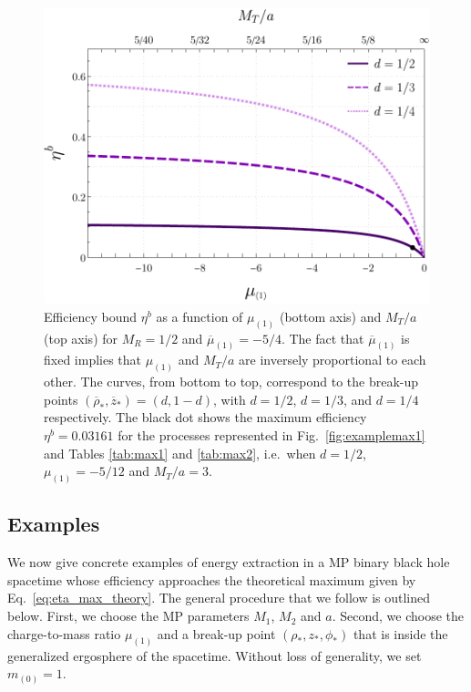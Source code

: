 \begin{figure}[!ht]
  \centering
  \includegraphics[width=\linewidth]{img/penrose_binaries/fig10.pdf}
  \caption{Efficiency bound $\eta ^ b$ as a function of $\mu_{(1)}$ (bottom axis) and $M_T/a$ (top axis) for $M_R=1/2$ and $\overline \mu _{(1)} = -5/4$. The fact that $\overline \mu _{(1)}$ is fixed implies that $\mu_{(1)}$ and $M_T/a$ are inversely proportional to each other. The curves, from bottom to top, correspond to the break-up points $(\overline \rho_*, \overline z_*)=(d,1-d)$, with $d=1/2$, $d=1/3$, and $d=1/4$ respectively. The black dot shows the maximum efficiency $\eta^b = 0.03161$ for the processes represented in Fig.~\ref{fig:examplemax1} and Tables \ref{tab:max1} and \ref{tab:max2}, i.e.~when $d=1/2$, $\mu_{(1)} = - 5/12$ and $M_T/a=3$.}
  \label{fig:efficiency1}
\end{figure}

\subsection{Examples}

We now give concrete examples of energy extraction in a \ac{MP} binary black hole spacetime whose efficiency approaches the theoretical maximum given by Eq.~\eqref{eq:eta_max_theory}. The general procedure that we follow is outlined below. First, we choose the \ac{MP} parameters $M_1$, $M_2$ and $a$. Second, we choose the charge-to-mass ratio $\mu_{(1)}$ and a break-up point $(\rho_*,z_*,\phi_*)$ that is inside the generalized ergosphere of the spacetime. Without loss of generality, we set $m_{(0)}=1$.

